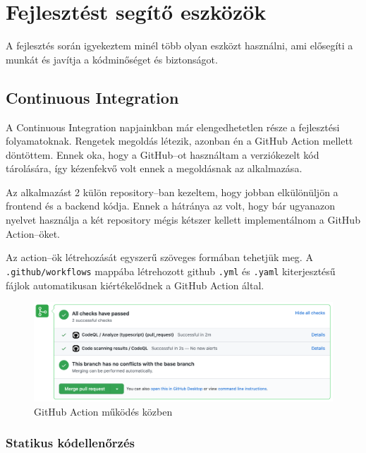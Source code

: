 \chapter{Fejlesztést segítő eszközök}
A fejlesztés során igyekeztem minél több olyan eszközt használni, ami elősegíti a munkát és javítja a kódminőséget és biztonságot.

\section{Continuous Integration}
A Continuous Integration napjainkban már elengedhetetlen része a fejlesztési folyamatoknak.
Rengetek megoldás létezik, azonban én a GitHub Action mellett döntöttem.
Ennek oka, hogy a GitHub–ot használtam a verziókezelt kód tárolására, így kézenfekvő volt ennek a megoldásnak az alkalmazása.

Az alkalmazást 2 külön repository–ban kezeltem, hogy jobban elkülönüljön a frontend és a backend kódja.
Ennek a hátránya az volt, hogy bár ugyanazon nyelvet használja a két repository mégis kétszer kellett implementálnom a GitHub Action–öket.

Az action–ök létrehozását egyszerű szöveges formában tehetjük meg. 
A \lstinline|.github/workflows| mappába létrehozott github \lstinline|.yml| és \lstinline|.yaml| kiterjesztésű fájlok automatikusan kiértékelődnek a GitHub Action által.

\begin{figure}[!ht]
  \centering
  \includegraphics[width=150mm, keepaspectratio]{figures/ci.png}
  \caption{GitHub Action működés közben}
  \label{fig:GitHubAction}
\end{figure}

\subsection{Statikus kódellenőrzés}

